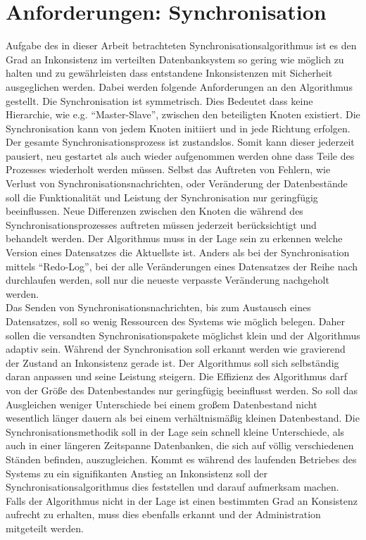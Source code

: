 \documentclass[a4paper,11pt,oneside,%
headsepline,												%
footsepline,												%
bibtotocnumbered									%
]{scrreprt}
\begin{document}
\section{Anforderungen: Synchronisation}
Aufgabe des in dieser Arbeit betrachteten Synchronisationsalgorithmus ist es den Grad an Inkonsistenz im verteilten Datenbanksystem so gering wie möglich zu halten und zu gewährleisten dass entstandene Inkonsistenzen mit Sicherheit ausgeglichen werden. Dabei werden folgende Anforderungen an den Algorithmus gestellt. Die Synchronisation ist symmetrisch. Dies Bedeutet dass keine Hierarchie, wie e.g. \enquote{Master-Slave}, zwischen den beteiligten Knoten existiert. Die Synchronisation kann von jedem Knoten initiiert und in jede Richtung erfolgen. Der gesamte Synchronisationsprozess ist zustandslos. Somit kann dieser jederzeit pausiert, neu gestartet als auch wieder aufgenommen werden ohne dass Teile des Prozesses wiederholt werden müssen. Selbst das Auftreten von Fehlern, wie Verlust von Synchronisationsnachrichten, oder Veränderung der Datenbestände soll die Funktionalität und Leistung der Synchronisation nur geringfügig beeinflussen. Neue Differenzen zwischen den Knoten die während des Synchronisationsprozesses auftreten müssen jederzeit berücksichtigt und behandelt werden. Der Algorithmus muss in der Lage sein zu erkennen welche Version eines Datensatzes die Aktuellste ist. Anders als bei der Synchronisation mittels \enquote{Redo-Log}, bei der alle Veränderungen eines Datensatzes der Reihe nach durchlaufen werden, soll nur die neueste verpasste Veränderung nachgeholt werden.\\

Das Senden von Synchronisationsnachrichten, bis zum Austausch eines Datensatzes, soll so wenig Ressourcen des Systems wie möglich belegen. Daher sollen die versandten Synchronisationspakete möglichst klein und der Algorithmus adaptiv sein. Während der Synchronisation soll erkannt werden wie gravierend der Zustand an Inkonsistenz gerade ist. Der Algorithmus soll sich selbständig daran anpassen und seine Leistung steigern. Die Effizienz des Algorithmus darf von der Größe des Datenbestandes nur geringfügig beeinflusst werden. So soll das Ausgleichen weniger Unterschiede bei einem großem Datenbestand nicht wesentlich länger dauern als bei einem verhältnismäßig kleinen Datenbestand. Die Synchronisationsmethodik soll in der Lage sein schnell kleine Unterschiede, als auch in einer längeren Zeitspanne Datenbanken, die sich auf völlig verschiedenen Ständen befinden, auszugleichen. Kommt es während des laufenden Betriebes des Systems zu ein signifikanten Anstieg an Inkonsistenz soll der Synchronisationsalgorithmus dies feststellen und darauf aufmerksam machen. Falls der Algorithmus nicht in der Lage ist einen bestimmten Grad an Konsistenz aufrecht zu erhalten, muss dies ebenfalls erkannt und der Administration mitgeteilt werden.\\
\end{document}
